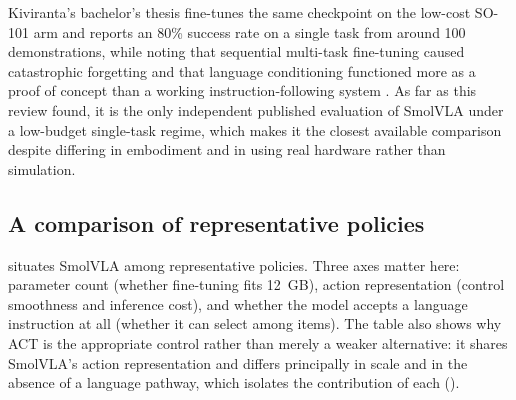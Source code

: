 Kiviranta's bachelor's thesis fine-tunes the same checkpoint on the low-cost SO-101 arm
and reports an 80\% success rate on a single task from around 100 demonstrations, while
noting that sequential multi-task fine-tuning caused catastrophic forgetting and that
language conditioning functioned more as a proof of concept than a working
instruction-following system \parencite{kiviranta2025smolvla}. As far as this review
found, it is the only independent published evaluation of SmolVLA under a low-budget
single-task regime, which makes it the closest available comparison despite differing in
embodiment and in using real hardware rather than simulation.

\subsection{A comparison of representative policies}
\label{sec:bg-compare}
 situates SmolVLA among representative policies. Three axes
matter here: parameter count (whether fine-tuning fits \SI{12}{GB}), action
representation (control smoothness and inference cost), and whether the model accepts a
language instruction at all (whether it can select among items). The table also shows
why ACT is the appropriate control rather than merely a weaker alternative: it shares
SmolVLA's action representation and differs principally in scale and in the absence of
a language pathway, which isolates the contribution of each ().


